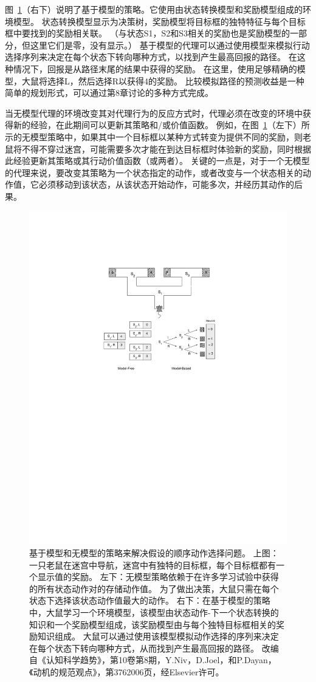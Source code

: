 {{{{{{{{{{{{{图~\ref{fig:11_8}（右下）说明了基于模型的策略。它使用由状态转换模型和奖励模型组成的环境模型。
状态转换模型显示为决策树，奖励模型将目标框的独特特征与每个目标框中要找到的奖励相关联。
（与状态S1，S2和S3相关的奖励也是奖励模型的一部分，但这里它们是零，没有显示。）
基于模型的代理可以通过使用模型来模拟行动选择序列来决定在每个状态下转向哪种方式，以找到产生最高回报的路径。
在这种情况下，回报是从路径末尾的结果中获得的奖励。
在这里，使用足够精确的模型，大鼠将选择L，然后选择R以获得4的奖励。
比较模拟路径的预测收益是一种简单的规划形式，可以通过第8章讨论的多种方式完成。


当无模型代理的环境改变其对代理行为的反应方式时，代理必须在改变的环境中获得新的经验，在此期间可以更新其策略和/或价值函数。
例如，在图~\ref{fig:11_8}（左下）所示的无模型策略中，如果其中一个目标框以某种方式转变为提供不同的奖励，则老鼠将不得不穿过迷宫，可能需要多次才能在到达目标框时体验新的奖励，同时根据此经验更新其策略或其行动价值函数（或两者）。
关键的一点是，对于一个无模型的代理来说，要改变其策略为一个状态指定的动作，或者改变与一个状态相关的动作值，它必须移动到该状态，从该状态开始动作，可能多次，并经历其动作的后果。


\begin{figure}[!htb]
	\centering
	\includegraphics[width=0.65\linewidth]{chap11/fig_11_8}
	\caption{基于模型和无模型的策略来解决假设的顺序动作选择问题。
		上图：一只老鼠在迷宫中导航，迷宫中有独特的目标框，每个目标框都有一个显示值的奖励。
		左下：无模型策略依赖于在许多学习试验中获得的所有状态动作对的存储动作值。
		为了做出决策，大鼠只需在每个状态下选择该状态动作值最大的动作。
		右下：在基于模型的策略中，大鼠学习一个环境模型，该模型由状态动作-下一个状态转换的知识和一个奖励模型组成，该奖励模型由与每个独特目标框相关的奖励知识组成。
		大鼠可以通过使用该模型模拟动作选择的序列来决定在每个状态下转向哪种方式，从而找到产生最高回报的路径。
		改编自《认知科学趋势》，第10卷第8期，Y.Niv，D.Joel，和P.Dayan，《动机的规范观点》，第3762006页，经Elsevier许可。  \label{fig:11_8}}
\end{figure}


}}}}}}}}}}}}}
